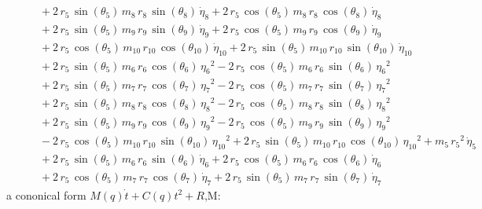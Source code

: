 \begin{eqnarray*}
 \\ &&\quad\mbox{} + 2\,r_{5}\,\sin({\theta_{5}})\,m_{8}\,r_{8}\,\sin(
{\theta_{8}})\,{\dot{\eta}_{8}} + 2\,r_{5}\,\cos({\theta_{5}})\,m_{8}
\,r_{8}\,\cos({\theta_{8}})\,{\dot{\eta}_{8}} \\ &&\quad\mbox{} + 2\,r
_{5}\,\sin({\theta_{5}})\,m_{9}\,r_{9}\,\sin({\theta_{9}})\,{
\dot{\eta}_{9}} + 2\,r_{5}\,\cos({\theta_{5}})\,m_{9}\,r_{9}\,\cos({
\theta_{9}})\,{\dot{\eta}_{9}} \\ &&\quad\mbox{} + 2\,r_{5}\,\cos({
\theta_{5}})\,m_{10}\,r_{10}\,\cos({\theta_{10}})\,{\dot{\eta}_{10}}
 + 2\,r_{5}\,\sin({\theta_{5}})\,m_{10}\,r_{10}\,\sin({\theta_{10}})\,
{\dot{\eta}_{10}} \\ &&\quad\mbox{} + 2\,r_{5}\,\sin({\theta_{5}})\,m
_{6}\,r_{6}\,\cos({\theta_{6}})\,{{\eta_{6}}}^2 - 2\,r_{5}\,\cos({
\theta_{5}})\,m_{6}\,r_{6}\,\sin({\theta_{6}})\,{{\eta_{6}}}^2
 \\ &&\quad\mbox{} + 2\,r_{5}\,\sin({\theta_{5}})\,m_{7}\,r_{7}\,\cos(
{\theta_{7}})\,{{\eta_{7}}}^2 - 2\,r_{5}\,\cos({\theta_{5}})\,m_{7}\,r
_{7}\,\sin({\theta_{7}})\,{{\eta_{7}}}^2 \\ &&\quad\mbox{} + 2\,r_{5}
\,\sin({\theta_{5}})\,m_{8}\,r_{8}\,\cos({\theta_{8}})\,{{\eta_{8}}}^2
 - 2\,r_{5}\,\cos({\theta_{5}})\,m_{8}\,r_{8}\,\sin({\theta_{8}})\,{{
\eta_{8}}}^2 \\ &&\quad\mbox{} + 2\,r_{5}\,\sin({\theta_{5}})\,m_{9}\,
r_{9}\,\cos({\theta_{9}})\,{{\eta_{9}}}^2 - 2\,r_{5}\,\cos({\theta_{5}
})\,m_{9}\,r_{9}\,\sin({\theta_{9}})\,{{\eta_{9}}}^2 \\ &&\quad\mbox{}
 - 2\,r_{5}\,\cos({\theta_{5}})\,m_{10}\,r_{10}\,\sin({\theta_{10}})\,
{{\eta_{10}}}^2 + 2\,r_{5}\,\sin({\theta_{5}})\,m_{10}\,r_{10}\,\cos({
\theta_{10}})\,{{\eta_{10}}}^2 + m_{5}\,{r_{5}}^2\,{\dot{\eta}_{5}}
 \\ &&\quad\mbox{} + 2\,r_{5}\,\sin({\theta_{5}})\,m_{6}\,r_{6}\,\sin(
{\theta_{6}})\,{\dot{\eta}_{6}} + 2\,r_{5}\,\cos({\theta_{5}})\,m_{6}
\,r_{6}\,\cos({\theta_{6}})\,{\dot{\eta}_{6}} \\ &&\quad\mbox{} + 2\,r
_{5}\,\cos({\theta_{5}})\,m_{7}\,r_{7}\,\cos({\theta_{7}})\,{
\dot{\eta}_{7}} + 2\,r_{5}\,\sin({\theta_{5}})\,m_{7}\,r_{7}\,\sin({
\theta_{7}})\,{\dot{\eta}_{7}} \end{eqnarray*}
a cononical form $M(q)\dot{t}+C(q)t^2 +R$,M:
 
